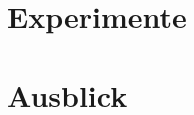 \documentclass[runningheads]{llncs}
\begin{document}

\section{Experimente}
	
	
\section{Ausblick}
	
%
%
\newpage


%
\end{document}
